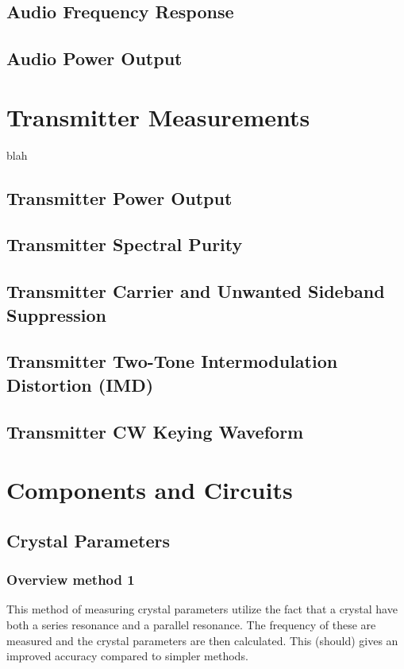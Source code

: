 \documentclass[10pt,letterpaper]{book}
\begin{document}
\section{Audio Frequency Response}
\section{Audio Power Output}
\chapter{Transmitter Measurements}
blah
\section{Transmitter Power Output}
\section{Transmitter Spectral Purity}
\section{Transmitter Carrier and Unwanted Sideband Suppression}
\section{Transmitter Two-Tone Intermodulation Distortion (IMD)}
\section{Transmitter CW Keying Waveform}
\chapter{Components and Circuits}

\newpage
\section{Crystal Parameters}

\subsection*{Overview method 1}
This method of measuring crystal parameters utilize the fact that a crystal have both a series resonance and a parallel resonance. The frequency of these are measured and the crystal parameters are then calculated. This (should) gives an improved accuracy compared to simpler methods. 
\end{document}
